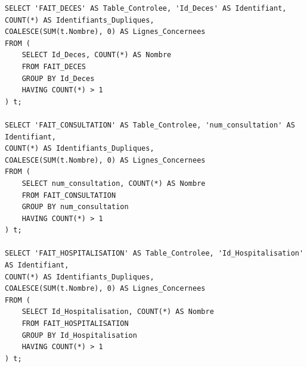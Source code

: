 \begin{verbatim}
SELECT 'FAIT_DECES' AS Table_Controlee, 'Id_Deces' AS Identifiant,
COUNT(*) AS Identifiants_Dupliques,
COALESCE(SUM(t.Nombre), 0) AS Lignes_Concernees
FROM (
    SELECT Id_Deces, COUNT(*) AS Nombre
    FROM FAIT_DECES
    GROUP BY Id_Deces
    HAVING COUNT(*) > 1
) t;

SELECT 'FAIT_CONSULTATION' AS Table_Controlee, 'num_consultation' AS Identifiant,
COUNT(*) AS Identifiants_Dupliques,
COALESCE(SUM(t.Nombre), 0) AS Lignes_Concernees
FROM (
    SELECT num_consultation, COUNT(*) AS Nombre
    FROM FAIT_CONSULTATION
    GROUP BY num_consultation
    HAVING COUNT(*) > 1
) t;

SELECT 'FAIT_HOSPITALISATION' AS Table_Controlee, 'Id_Hospitalisation' AS Identifiant,
COUNT(*) AS Identifiants_Dupliques,
COALESCE(SUM(t.Nombre), 0) AS Lignes_Concernees
FROM (
    SELECT Id_Hospitalisation, COUNT(*) AS Nombre
    FROM FAIT_HOSPITALISATION
    GROUP BY Id_Hospitalisation
    HAVING COUNT(*) > 1
) t;
\end{verbatim}
